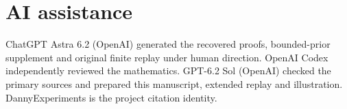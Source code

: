 \documentclass[11pt,a4paper]{amsart}
\begin{document}
\section*{AI assistance}
ChatGPT Astra 6.2 (OpenAI) generated the recovered proofs, bounded-prior supplement and original finite replay under human direction. OpenAI Codex independently reviewed the mathematics. GPT-6.2 Sol (OpenAI) checked the primary sources and prepared this manuscript, extended replay and illustration. DannyExperiments is the project citation identity.



\end{document}

